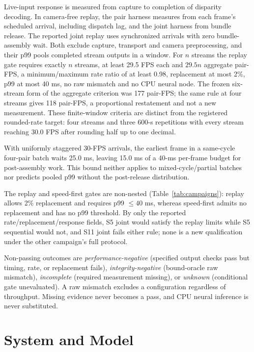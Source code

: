 \documentclass[sigconf,review,anonymous]{acmart}
\begin{document}
Live-input response is measured from capture to completion of disparity decoding. In camera-free replay, the pair harness measures from each frame's scheduled arrival, including dispatch lag, and the joint harness from bundle release. The reported joint replay uses synchronized arrivals with zero bundle-assembly wait. Both exclude capture, transport and camera preprocessing, and their p99 pools completed stream outputs in a window. For $n$ streams the replay gate requires exactly $n$ streams, at least 29.5 FPS each and $29.5n$ aggregate pair-FPS, a minimum/maximum rate ratio of at least 0.98, replacement at most 2\%, p99 at most 40 ms, no raw mismatch and no CPU neural node. The frozen six-stream form of the aggregate criterion was 177 pair-FPS; the same rule at four streams gives 118 pair-FPS, a proportional restatement and not a new measurement. These finite-window criteria are distinct from the registered rounded-rate target: four streams and three 600-s repetitions with every stream reaching 30.0 FPS after rounding half up to one decimal.

With uniformly staggered 30-FPS arrivals, the earliest frame in a same-cycle four-pair batch waits 25.0 ms, leaving 15.0 ms of a 40-ms per-frame budget for post-assembly work. This bound neither applies to mixed-cycle/partial batches nor predicts pooled p99 without the post-release distribution.

The replay and speed-first gates are non-nested (Table~\ref{tab:campaigns}): replay allows 2\% replacement and requires p99 $\le40$ ms, whereas speed-first admits no replacement and has no p99 threshold. By only the reported rate/replacement/response fields, S5 joint would satisfy the replay limits while S5 sequential would not, and S11 joint fails either rule; none is a new qualification under the other campaign's full protocol.

Non-passing outcomes are \emph{performance-negative} (specified output checks pass but timing, rate, or replacement fails), \emph{integrity-negative} (bound-oracle raw mismatch), \emph{incomplete} (required measurement missing), or \emph{unknown} (conditional gate unevaluated). A raw mismatch excludes a configuration regardless of throughput. Missing evidence never becomes a pass, and CPU neural inference is never substituted.

\section{System and Model}
\end{document}

